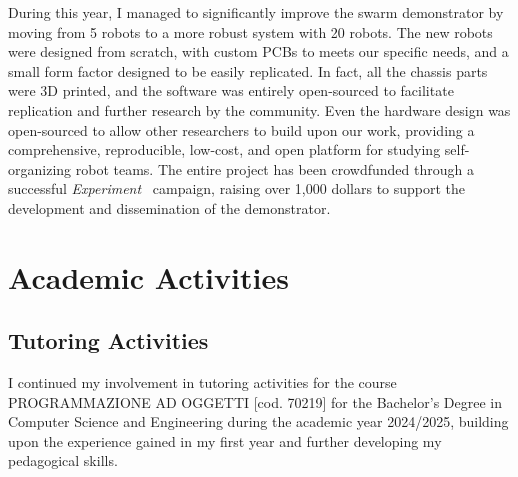 \documentclass[runningheads]{llncs}
\begin{document}
During this year,
I managed to significantly improve the swarm demonstrator by moving from 5 robots to a more robust system with 20 robots.
%
The new robots were designed from scratch,
with custom PCBs to meets our specific needs,
and a small form factor designed to be easily replicated.
%
In fact,
all the chassis parts were 3D printed,
and the software was entirely open-sourced to facilitate replication and further research by the community.
%
Even the hardware design was open-sourced to allow other researchers to build upon our work,
providing a comprehensive, reproducible, low-cost, and open platform for studying self-organizing robot teams.
%
The entire project has been crowdfunded through a successful \emph{Experiment}~\cite{GianlucaAguzzi2025} campaign,
raising over 1,000 dollars to support the development and dissemination of the demonstrator.




\section{Academic Activities}

\subsection{Tutoring Activities}

I continued my involvement in tutoring activities for the course PROGRAMMAZIONE AD OGGETTI [cod. 70219] for the Bachelor's Degree in Computer Science and Engineering during the academic year 2024/2025, building upon the experience gained in my first year and further developing my pedagogical skills.
\end{document}
